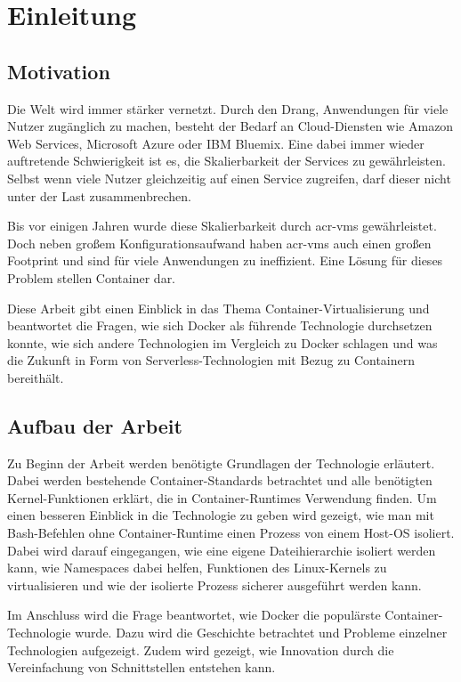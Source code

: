 \chapter{Einleitung}
\label{chap:einleitung}

\section{Motivation}
\label{sec:motivation}
Die Welt wird immer stärker vernetzt. Durch den Drang, Anwendungen für viele Nutzer zugänglich zu machen, besteht der Bedarf an Cloud-Diensten wie Amazon Web Services, Microsoft Azure oder IBM Bluemix. Eine dabei immer wieder auftretende Schwierigkeit ist es, die Skalierbarkeit der Services zu gewährleisten. Selbst wenn viele Nutzer gleichzeitig auf einen Service zugreifen, darf dieser nicht unter der Last zusammenbrechen.

Bis vor einigen Jahren wurde diese Skalierbarkeit durch \glspl{acr-vm} gewährleistet. Doch neben großem Konfigurationsaufwand haben \glspl{acr-vm} auch einen großen Footprint und sind für viele  Anwendungen zu ineffizient. Eine Lösung für dieses Problem stellen Container dar.

Diese Arbeit gibt einen Einblick in das Thema Container-Virtualisierung und beantwortet die Fragen, wie sich Docker als führende Technologie durchsetzen konnte, wie sich andere Technologien im Vergleich zu Docker schlagen und was die Zukunft in Form von Serverless-Technologien mit Bezug zu Containern bereithält.

\section{Aufbau der Arbeit}
\label{sec:aufbau}
Zu Beginn der Arbeit werden benötigte Grundlagen der Technologie erläutert. Dabei werden bestehende Container-Standards betrachtet und alle benötigten Kernel-Funktionen erklärt, die in Container-Runtimes Verwendung finden. Um einen besseren Einblick in die Technologie zu geben wird gezeigt, wie man mit Bash-Befehlen ohne Container-Runtime einen Prozess von einem Host-OS isoliert. Dabei wird darauf eingegangen, wie eine eigene Dateihierarchie isoliert werden kann, wie Namespaces dabei helfen, Funktionen des Linux-Kernels zu virtualisieren und wie der isolierte Prozess sicherer ausgeführt werden kann.

Im Anschluss wird die Frage beantwortet, wie Docker die populärste Container-Technologie wurde. Dazu wird die Geschichte betrachtet und Probleme einzelner Technologien aufgezeigt. Zudem wird gezeigt, wie Innovation durch die Vereinfachung von Schnittstellen entstehen kann.

